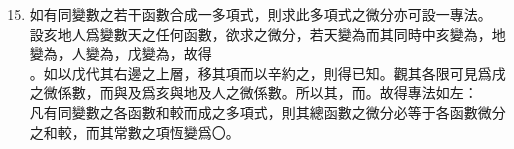 \begin{enumerate} [label={第\chinese*款}]
	\setcounter{enumi}{14}
	\item 如有同變數之若干函數合成一多項式，則求此多項式之微分亦可設一專法。\\
	設亥地人爲變數天之任何函數，欲求\CJKmove 之微分，若天變為\CJKmove 而其同時中亥變為\CJKmove，地變為\CJKmove，人變為\CJKmove，戊變為\CJKmove，故得\\\CJKmove。如以戊代其右邊之上層，移其項而以辛約之，則得已知\CJKmove。觀其各限可見\CJKmove 爲戌之微係數，而\CJKmove 與\CJKmove 及\CJKmove 爲亥與地及人之微係數。所以其\CJKmove，而\CJKmove。故得專法如左：\\
	凡有同變數之各函數和較而成之多項式，則其總函數之微分必等于各函數微分之和較，而其常數之項恆變爲〇。
\end{enumerate}

